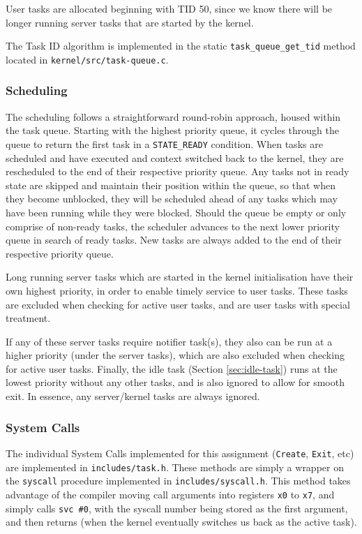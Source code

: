 \documentclass[12pt, titlepage]{article}
\begin{document}
    User tasks are allocated beginning with TID 50, since we know there will be longer running server tasks that are started by the kernel.

    The Task ID algorithm is implemented in the static \verb`task_queue_get_tid` method located in \verb`kernel/src/task-queue.c`.

    \subsubsection{Scheduling}
    \label{sec:scheduling}

    The scheduling follows a straightforward round-robin approach, housed within the task queue.
    Starting with the highest priority queue, it cycles through the queue to return the first task in a \verb`STATE_READY` condition.
    When tasks are scheduled and have executed and context switched back to the kernel, they are rescheduled to the end of their respective priority queue. 
    Any tasks not in ready state are skipped and maintain their position within the queue, so that when they become unblocked, they will be scheduled ahead of any tasks which may have been running while they were blocked.
    Should the queue be empty or only comprise of non-ready tasks, the scheduler advances to the next lower priority queue in search of ready tasks.
    New tasks are always added to the end of their respective priority queue.

    Long running server tasks which are started in the kernel initialisation have their own highest priority, in order to enable timely service to user tasks. These tasks are excluded when checking for active user tasks, and are user tasks with special treatment. 
    
    If any of these server tasks require notifier task(s), they also can be run at a higher priority (under the server tasks), which are also excluded when checking for active user tasks. Finally, the idle task (Section \ref{sec:idle-task}) runs at the lowest priority without any other tasks, and is also ignored to allow for smooth exit. In essence, any server/kernel tasks are always ignored.

    \subsubsection{System Calls}
    \label{sec:sys-calls}

    The individual System Calls implemented for this assignment (\verb`Create`, \verb`Exit`, etc) are implemented in \verb`includes/task.h`. These methods are simply a wrapper on the \verb`syscall` procedure implemented in \verb`includes/syscall.h`. This method takes advantage of the compiler moving call arguments into registers \verb`x0` to \verb`x7`, and simply calls \verb`svc #0`, with the syscall number being stored as the first argument, and then returns (when the kernel eventually switches us back as the active task).
\end{document}
